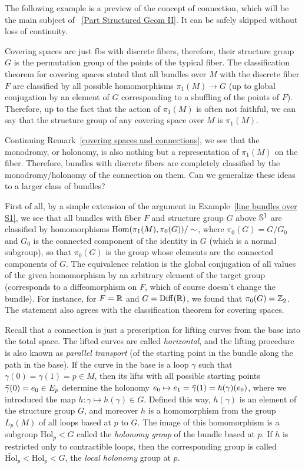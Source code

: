 The following example is a preview of the concept of connection, which will be the main subject of \Part~\ref{Part Structured Geom II}. It can be safely skipped without loss of continuity.

\begin{example}
	Covering spaces are just \glspl{fb} with discrete fibers, therefore, their structure group $G$ is the permutation group of the points of the typical fiber. The classification theorem for covering spaces stated that all bundles over $M$ with the discrete fiber $F$ are classified by all possible homomorphisms $\pi_1(M)\to G$ (up to global conjugation by an element of $G$ corresponding to a shuffling of the points of $F$). Therefore, up to the fact that the action of $\pi_1(M)$ is often not faithful, we can say that the structure group of any covering space over $M$ is $\pi_1(M)$.
	
	Continuing Remark~\ref{covering spaces and connections}, we see that the monodromy, or holonomy, is also nothing but a representation of $\pi_1(M)$ on the fiber. Therefore, bundles with discrete fibers are completely classified by the monodromy/holonomy of the connection on them. Can we generalize these ideas to a larger class of bundles?
	
	First of all, by a simple extension of the argument in Example~\ref{line bundles over S1}, we see  that all bundles with fiber $F$ and structure group $G$ above $\mathbb{S}^1$ are classified by homomorphisms $\operatorname{Hom}(\pi_1(M),\allowbreak\pi_0(G))/\sim$, where $\pi_0(G)=G/G_0$ and $G_0$ is the connected component of the identity in $G$ (which is a normal subgroup), so that $\pi_0(G)$ is the group whose elements are the connected components of $G$. The equivalence relation is the global conjugation of all values of the given homomorphism by an arbitrary element of the target group (corresponds to a diffeomorphism on $F$, which of course doesn't change the bundle). For instance, for $F=\mathbb{R} $ and $G=\operatorname{Diff}(\mathbb{R} )$, we found that $\pi_0(G)=\mathbb{Z}_2$. The statement also agrees with the classification theorem for covering spaces.
	
	Recall that a connection is just a prescription for lifting curves from the base into the total space. The lifted curves are called \emph{horizontal}, and the lifting procedure is also known as \emph{parallel transport} (of the starting point in the bundle along the path in the base). If the curve in the base is a loop $\gamma$ such that $\gamma(0)=\gamma(1)=p\in M$, then its lifts with all possible starting points $\wt{\gamma}(0)=e_0\in E_p$ determine the holonomy $e_0\mapsto e_1=\wt{\gamma}(1)=h(\gamma)(e_0)$, where we introduced the map $h:\gamma\mapsto h(\gamma)\in G$. Defined this way, $h(\gamma)$ is an element of the structure group $G$, and moreover $h$ is a homomorphism from the group $L_p(M)$ of all loops based at $p$ to $G$. The image of this homomorphism is a subgroup $\mathrm{Hol}_p<G$ called the \emph{holonomy group} of the bundle based at $p$. If $h$ is restricted only to contractible loops, then the corresponding group is called $\widetilde{\mathrm{Hol}}_p<\mathrm{Hol}_p<G$, the \emph{local holonomy} group at $p$. 
	

\end{example}
